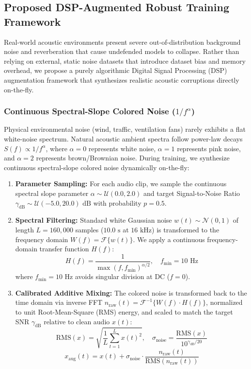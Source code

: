 \documentclass[11pt,a4paper]{article}
\begin{document}
\subsection{Proposed DSP-Augmented Robust Training Framework}
\label{sec:dsp_augmentations}
Real-world acoustic environments present severe out-of-distribution background noise and reverberation that cause undefended models to collapse. Rather than relying on external, static noise datasets that introduce dataset bias and memory overhead, we propose a purely algorithmic Digital Signal Processing (DSP) augmentation framework that synthesizes realistic acoustic corruptions directly on-the-fly.

\subsubsection{Continuous Spectral-Slope Colored Noise \texorpdfstring{($1/f^\alpha$)}{(1/f\textasciicircum alpha)}}
Physical environmental noise (wind, traffic, ventilation fans) rarely exhibits a flat white-noise spectrum. Natural acoustic ambient spectra follow power-law decays $S(f) \propto 1/f^\alpha$, where $\alpha=0$ represents white noise, $\alpha=1$ represents pink noise, and $\alpha=2$ represents brown/Brownian noise. During training, we synthesize continuous spectral-slope colored noise dynamically on-the-fly:
\begin{enumerate}
    \item \textbf{Parameter Sampling:} For each audio clip, we sample the continuous spectral slope parameter $\alpha \sim \mathcal{U}(0.0, 2.0)$ and target Signal-to-Noise Ratio $\gamma_{\text{dB}} \sim \mathcal{U}(-5.0, 20.0)\text{ dB}$ with probability $p=0.5$.
    \item \textbf{Spectral Filtering:} Standard white Gaussian noise $w(t) \sim \mathcal{N}(0, 1)$ of length $L = 160,000$ samples ($10.0\text{ s}$ at $16\text{ kHz}$) is transformed to the frequency domain $W(f) = \mathcal{F}\{w(t)\}$. We apply a continuous frequency-domain transfer function $H(f)$:
    \begin{equation}
        H(f) = \frac{1}{\max(f, f_{\text{min}})^{\alpha/2}}, \quad f_{\text{min}} = 10\text{ Hz}
    \end{equation}
    where $f_{\text{min}} = 10\text{ Hz}$ avoids singular division at DC ($f=0$).
    \item \textbf{Calibrated Additive Mixing:} The colored noise is transformed back to the time domain via inverse FFT $n_{\text{raw}}(t) = \mathcal{F}^{-1}\{W(f) \cdot H(f)\}$, normalized to unit Root-Mean-Square (RMS) energy, and scaled to match the target SNR $\gamma_{\text{dB}}$ relative to clean audio $x(t)$:
    \begin{equation}
        \text{RMS}(x) = \sqrt{\frac{1}{L}\sum_{t=1}^L x(t)^2}, \quad \sigma_{\text{noise}} = \frac{\text{RMS}(x)}{10^{\gamma_{\text{dB}}/20}}
    \end{equation}
    \begin{equation}
        x_{\text{aug}}(t) = x(t) + \sigma_{\text{noise}} \cdot \frac{n_{\text{raw}}(t)}{\text{RMS}(n_{\text{raw}}(t))}
    \end{equation}
\end{enumerate}
\end{document}
